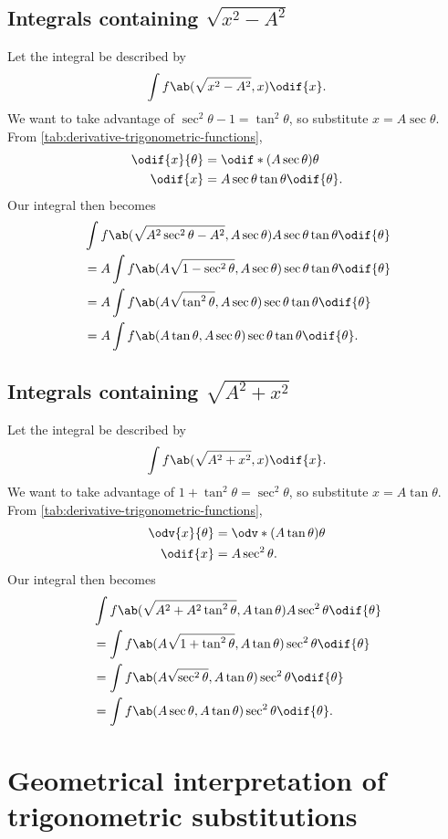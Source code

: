 \subsection*{Integrals containing $\sqrt{x^2 - A^2}$}

Let the integral be described by
\begin{equation}
	\int f\ab(\sqrt{x^2 - A^2}, x)\odif{x}.
\end{equation}
We want to take advantage of $\sec^2\theta - 1 = \tan^2\theta$, so substitute $x = A\sec\theta$. From \cref{tab:derivative-trigonometric-functions},
\begin{align}
	\odif{x}{\theta} & = \odif*{(A\sec\theta)}{\theta}       \\
	\odif{x}         & = A\sec\theta\tan\theta\odif{\theta}.
\end{align}
Our integral then becomes
\begin{align}
	 & \int f\ab(\sqrt{A^2\sec^2\theta - A^2}, A\sec\theta)A\sec\theta\tan\theta\odif{\theta} \nonumber \\
	 & = A\int f\ab(A\sqrt{1 - \sec^2\theta}, A\sec\theta)\sec\theta\tan\theta\odif{\theta}             \\
	 & = A\int f\ab(A\sqrt{\tan^2\theta}, A\sec\theta)\sec\theta\tan\theta\odif{\theta}                 \\
	 & = A\int f\ab(A\tan\theta, A\sec\theta)\sec\theta\tan\theta\odif{\theta}.
\end{align}

\subsection*{Integrals containing $\sqrt{A^2 + x^2}$}

Let the integral be described by
\begin{equation}
	\int f\ab(\sqrt{A^2 + x^2}, x)\odif{x}.
\end{equation}
We want to take advantage of $1 + \tan^2\theta = \sec^2\theta$, so substitute $x = A\tan\theta$. From \cref{tab:derivative-trigonometric-functions},
\begin{align}
	\odv{x}{\theta} & = \odv*{(A\tan\theta)}{\theta} \\
	\odif{x}        & = A\sec^2\theta.
\end{align}
Our integral then becomes
\begin{align}
	 & \int f\ab(\sqrt{A^2 + A^2\tan^2\theta}, A\tan\theta)A\sec^2\theta\odif{\theta} \nonumber \\
	 & = \int f\ab(A\sqrt{1 + \tan^2\theta}, A\tan\theta)\sec^2\theta\odif{\theta}              \\
	 & = \int f\ab(A\sqrt{\sec^2\theta}, A\tan\theta)\sec^2\theta\odif{\theta}                  \\
	 & = \int f\ab(A\sec\theta, A\tan\theta)\sec^2\theta\odif{\theta}.
\end{align}

\section{Geometrical interpretation of trigonometric substitutions}
